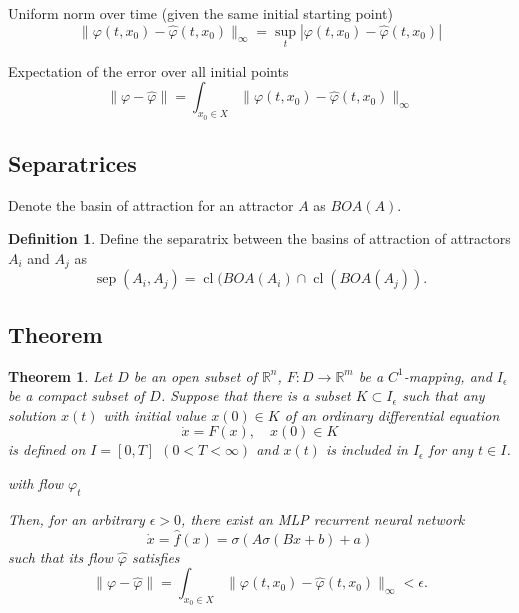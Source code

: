 \documentclass{article}
\newtheorem{theorem}{Theorem}
\theoremstyle{definition}
\newtheorem{definition}{Definition}
\theoremstyle{remark}
\newcommand{\sep}{\operatorname{sep}}
\newcommand{\cl}{\operatorname{cl}}
\begin{document}
Uniform norm over time (given the same initial starting point)
\begin{equation}
\|\varphi(t,x_0)-\hat \varphi(t,x_0)\|_\infty = \sup_t|\varphi(t,x_0)-\hat \varphi(t,x_0)|
\end{equation}


Expectation of the error over all initial points
\begin{equation}
\|\varphi-\hat \varphi\| = \int_{x_0\in X}\|\varphi(t,x_0)-\hat \varphi(t,x_0)\|_\infty
\end{equation}


\subsection{Separatrices}

Denote the basin of attraction for an attractor $A$ as $BOA(A)$.

\begin{definition}	
Define the separatrix between the basins of attraction of attractors $A_i$ and $A_j$ as 
\begin{equation}
\sep(A_i,A_j) = \cl(BOA(A_i)\cap \cl(BOA(A_j)).
\end{equation}
\end{definition}

\subsection{Theorem}
\begin{theorem}
Let $D$ be an open subset of $\mathbb{R}^n$, $F : D \to \mathbb{R}^m$ be a $C^1$-mapping, and $I_\epsilon$ be a compact subset of $D$.
Suppose that there is a subset $K \subset I_\epsilon$ such that any solution $x(t)$ with initial value $x(0) \in K$ of an ordinary differential equation
\begin{equation}\label{eq:5}
    \dot{x} = F(x), \quad x(0) \in K
\end{equation}
is defined on $I = [0, T]$ $(0 < T < \infty)$ and $x(t)$ is included in $I_\epsilon$ for any $t \in I$.

with flow $\varphi_t$ 


 Then, for an arbitrary $\epsilon > 0$, there exist an MLP recurrent neural network 
 \begin{equation}
\dot x = \hat f(x) = \sigma(A\sigma(Bx+b)+a)
\end{equation}
such that its flow $\hat \varphi$ satisfies
\begin{equation}
\|\varphi-\hat \varphi\| = \int_{x_0\in X}\|\varphi(t,x_0)-\hat \varphi(t,x_0)\|_\infty<\epsilon.
\end{equation}
\end{theorem}
\end{document}
